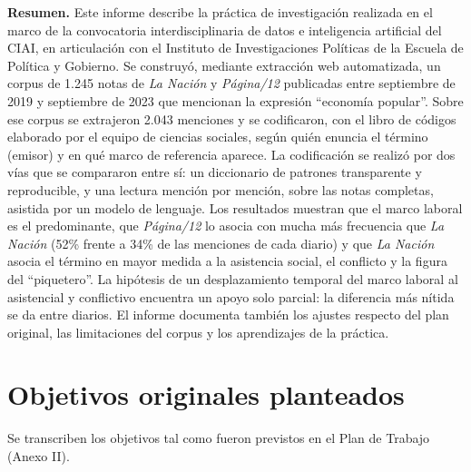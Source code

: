 \documentclass[11pt,a4paper]{article}
\newcommand{\pdoce}{\textit{Página/12}}
\newcommand{\lanac}{\textit{La Nación}}
\newcommand{\EP}{economía popular}
\begin{document}
\vspace{0.6em}
\noindent{}

\vspace{0.8em}
\noindent\textbf{Resumen.} Este informe describe la práctica de investigación realizada en el marco de la convocatoria interdisciplinaria de datos e inteligencia artificial del CIAI, en articulación con el Instituto de Investigaciones Políticas de la Escuela de Política y Gobierno. Se construyó, mediante extracción web automatizada, un corpus de 1.245 notas de \lanac{} y \pdoce{} publicadas entre septiembre de 2019 y septiembre de 2023 que mencionan la expresión \enquote{\EP}. Sobre ese corpus se extrajeron 2.043 menciones y se codificaron, con el libro de códigos elaborado por el equipo de ciencias sociales, según quién enuncia el término (emisor) y en qué marco de referencia aparece. La codificación se realizó por dos vías que se compararon entre sí: un diccionario de patrones transparente y reproducible, y una lectura mención por mención, sobre las notas completas, asistida por un modelo de lenguaje. Los resultados muestran que el marco laboral es el predominante, que \pdoce{} lo asocia con mucha más frecuencia que \lanac{} (52\% frente a 34\% de las menciones de cada diario) y que \lanac{} asocia el término en mayor medida a la asistencia social, el conflicto y la figura del \enquote{piquetero}. La hipótesis de un desplazamiento temporal del marco laboral al asistencial y conflictivo encuentra un apoyo solo parcial: la diferencia más nítida se da entre diarios. El informe documenta también los ajustes respecto del plan original, las limitaciones del corpus y los aprendizajes de la práctica.

\tableofcontents
\newpage

\section{Objetivos originales planteados}

Se transcriben los objetivos tal como fueron previstos en el Plan de Trabajo (Anexo II).
\end{document}
